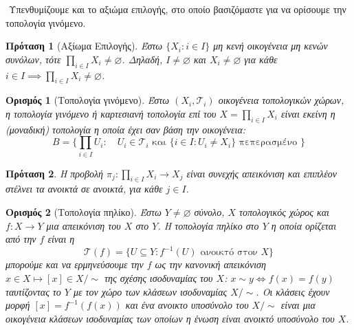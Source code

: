 \documentclass[oneside,a4paper]{article}
\newtheorem*{defn}{Ορισμός}
\newtheorem{prop}{Πρόταση}
\begin{document}
$ $\newline
\noindent Υπενθυμίζουμε και το αξιώμα επιλογής, στο οποίο βασιζόμαστε για να ορίσουμε την τοπολογία γινόμενο.

\begin{prop}[Αξίωμα Επιλογής]
	Έστω $\{X_i: i \in I\}$ μη κενή οικογένεια μη κενών συνόλων, τότε $\prod\limits_{i \in I} X_i \neq \varnothing$. Δηλαδή, $I\neq \varnothing$ και $X_i \neq \varnothing$ για κάθε $i \in I \implies \prod\limits_{i \in I} X_i \neq \varnothing$.
\end{prop}

\vspace{0.1cm}

\begin{defn}[Τοπολογία γινόμενο]
	Έστω $(X_i, \mathcal{T}_i)$ οικογένεια τοπολογικών χώρων, η τοπολογία γινόμενο ή καρτεσιανή τοπολογία επί του $X = \prod\limits_{i \in I} X_i$ είναι εκείνη η (μοναδική) τοπολογία η οποία έχει σαν βάση την οικογένεια:
	$$B = \big\{\prod\limits_{i \in I} U_i: \quad U_i \in \mathcal{T}_i \text{ και } \{i \in I: U_i \neq X_i\} \text{ πεπερασμένο } \big\}$$
\end{defn}

\vspace{0.1cm}

\begin{prop}
	Η προβολή $\pi_j : \prod\limits_{i \in I} X_i \rightarrow X_j$ είναι συνεχής απεικόνιση και επιπλέον στέλνει τα ανοικτά σε ανοικτά, για κάθε $j \in I$. 
\end{prop}

\vspace{0.1cm}

\begin{defn}[Τοπολογία πηλίκο]
	Έστω $Y \neq \varnothing$ σύνολο, $X$ τοπολογικός χώρος και $f : X \rightarrow Y$ μια απεικόνιση του $X$ στο $Y$. Η τοπολογία πηλίκο στο $Y$ η οποία ορίζεται από την $f$ είναι η
	$$\mathcal T(f) = \{ U \subseteq Y: f^{-1} (U) \text{ ανοικτό στον } X\}$$
	μπορούμε και να ερμηνεύσουμε την $f$ ως την κανονική απεικόνιση $ x\in X \mapsto [x] \in X/ \sim$ της σχέσης ισοδυναμίας του $X$: $x \sim y \iff f(x) = f(y)$ ταυτίζοντας το $Y$ με τον χώρο των κλάσεων ισοδυναμίας $X/\sim$. Οι κλάσεις έχουν μορφή $[x] = f^{-1}( f(x))$ και ένα ανοικτο υποσύνολο του $X/ \sim$ είναι μια οικογένεια κλάσεων ισοδυναμίας των οποίων η ένωση είναι ανοικτό υποσύνολο του $X$.
\end{defn}

\vspace{0.1cm}
\end{document}
